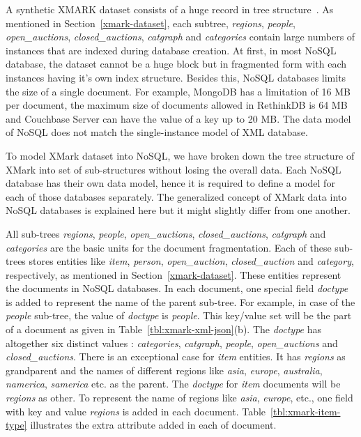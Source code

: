 A synthetic XMARK dataset consists of a huge record in tree structure~\citep{xmark/VIST}. As mentioned in Section~\ref{xmark-dataset}, each subtree, \textit{regions}, \textit{people}, \textit{open\_auctions}, \textit{closed\_auctions}, \textit{catgraph} and \textit{categories} contain large numbers of instances that are indexed during database creation. At first, in most NoSQL database, the dataset cannot be a huge block but in fragmented form with each instances having it's own index structure. Besides this, NoSQL databases limits the size of a single document. For example, MongoDB has a limitation of 16 MB per document, the maximum size of documents allowed in RethinkDB is 64 MB and Couchbase Server can have the value of a key up to 20 MB. The data model of NoSQL does not match the single-instance model of XML database.
\par 
To model XMark dataset into NoSQL, we have broken down the tree structure of XMark into set of sub-structures without losing the overall data. Each NoSQL database has their own data model, hence it is required to define a model for each of those databases separately. The generalized concept of  XMark data into NoSQL databases is explained here but it might slightly differ from one another. 

All sub-trees \textit{regions}, \textit{people}, \textit{open\_auctions}, \textit{closed\_auctions}, \textit{catgraph} and \textit{categories} are the basic units for the document fragmentation. Each of these sub-trees stores entities like \textit{item}, \textit{person}, \textit{open\_auction}, \textit{closed\_auction} and \textit{category}, respectively, as mentioned in Section~\ref{xmark-dataset}. These entities represent the documents in NoSQL databases. In each document, one special field \textit{doctype} is added to represent the name of the parent sub-tree. For example, in case of the \textit{people} sub-tree, the value of \textit{doctype} is \textit{people}. This key/value set will be the part of a document as  given in Table~\ref{tbl:xmark-xml-json}(b). The \textit{doctype} has altogether six distinct values : \textit{categories}, \textit{catgraph}, \textit{people}, \textit{open\_auctions} and \textit{closed\_auctions}. There is an exceptional case for \textit{item} entities. It has \textit{regions} as grandparent and the names of different regions like \textit{asia}, \textit{europe}, \textit{australia}, \textit{namerica}, \textit{samerica} etc. as the parent.  The \textit{doctype} for \textit{item} documents will be \textit{regions} as other. To represent the name of regions like \textit{asia}, \textit{europe}, etc.,  one field with key and value \textit{regions} is added in each document. 
Table~\ref{tbl:xmark-item-type} illustrates the extra attribute added in each of document.

